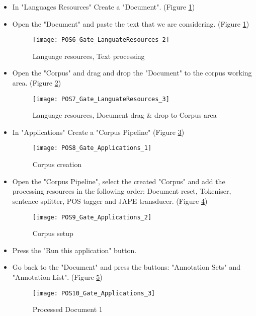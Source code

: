 \begin{itemize}
		\item In "Languages Resources" Create a "Document". (Figure \ref{fig:POS6})
		\item Open the "Document" and paste the text that we are considering. (Figure \ref{fig:POS6})
		
			\begin{figure}\centering
				\texttt{[image: POS6\_Gate\_LanguateResources\_2]}
				\caption{Language resources, Text processing}\label{fig:POS6}
			\end{figure}
		
		\item Open the "Corpus" and drag and drop the "Document" to the corpus working area. (Figure \ref{fig:POS7})
		
			\begin{figure}\centering
				\texttt{[image: POS7\_Gate\_LanguateResources\_3]}
				\caption{Language resources, Document drag \& drop to Corpus area}\label{fig:POS7}
			\end{figure}
		
		\item In "Applications" Create a "Corpus Pipeline" (Figure \ref{fig:POS8})
		
			\begin{figure}\centering
				\texttt{[image: POS8\_Gate\_Applications\_1]}
				\caption{Corpus creation}\label{fig:POS8}
			\end{figure}
		
		\item Open the "Corpus Pipeline", select the created "Corpus" and add the processing resources in the following order: Document reset, Tokeniser, sentence splitter, POS tagger and JAPE transducer. (Figure \ref{fig:POS9})
		
			\begin{figure}\centering
				\texttt{[image: POS9\_Gate\_Applications\_2]}
				\caption{Corpus setup}\label{fig:POS9}
			\end{figure}
		
		\item Press the "Run this application" button.
		\item Go back to the "Document" and press the buttons: "Annotation Sets" and "Annotation List". (Figure \ref{fig:POS10})
		
			\begin{figure}\centering
				\texttt{[image: POS10\_Gate\_Applications\_3]}
				\caption{Processed Document 1}\label{fig:POS10}
			\end{figure}
		

\end{itemize}
